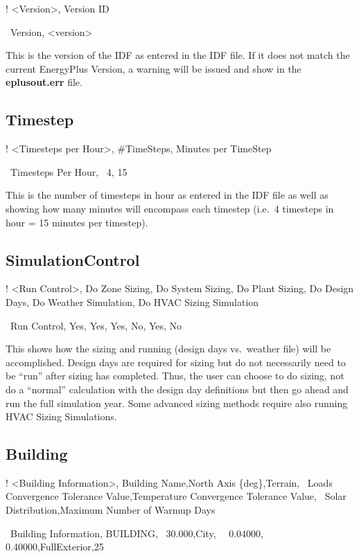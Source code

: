 ! \textless{}Version\textgreater{}, Version ID

~Version, \textless{}version\textgreater{}

This is the version of the IDF as entered in the IDF file. If it does not match the current EnergyPlus Version, a warning will be issued and show in the \textbf{eplusout.err} file.

\subsection{Timestep}\label{timestep}

! \textless{}Timesteps per Hour\textgreater{}, \#TimeSteps, Minutes per TimeStep

~Timesteps Per Hour,~ 4, 15

This is the number of timesteps in hour as entered in the IDF file as well as showing how many minutes will encompass each timestep (i.e.~4 timesteps in hour = 15 minutes per timestep).

\subsection{SimulationControl}\label{simulationcontrol}

! \textless{}Run Control\textgreater{}, Do Zone Sizing, Do System Sizing, Do Plant Sizing, Do Design Days, Do Weather Simulation, Do HVAC Sizing Simulation

~Run Control, Yes, Yes, Yes, No, Yes, No

This shows how the sizing and running (design days vs.~weather file) will be accomplished. Design days are required for sizing but do not necessarily need to be ``run'' after sizing has completed. Thus, the user can choose to do sizing, not do a ``normal'' calculation with the design day definitions but then go ahead and run the full simulation year. Some advanced sizing methods require also running HVAC Sizing Simulations.

\subsection{Building}\label{building}

! \textless{}Building Information\textgreater{}, Building Name,North Axis \{deg\},Terrain,~ Loads Convergence Tolerance Value,Temperature Convergence Tolerance Value,~ Solar Distribution,Maximum Number of Warmup Days

~Building Information, BUILDING,~ 30.000,City,~~ 0.04000,~~ 0.40000,FullExterior,25

